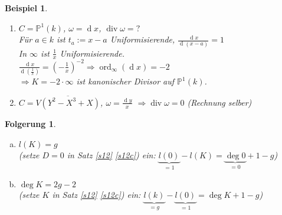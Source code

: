 \documentclass[a4paper,12pt]{report}
\theoremstyle{break}
\newtheorem{Folg}[Def]{Folgerung}
\theoremstyle{nonumberbreak}
\newtheorem{nnBsp}{Beispiel}
\theoremstyle{nonumberplain}
\DeclareMathOperator{\ddiv}{div}
\DeclareMathOperator{\dd}{d} %
\DeclareMathOperator{\ord}{ord}
\newcommand{\IP}{\mathbb{P}}%
\begin{document}
\begin{nnBsp}\begin{enumerate}[1)]
\item
	$C=\IP^1(k)$, $\omega=\dd x$, $\ddiv \omega =?$\\
	F\"ur $a\in k$ ist $t_a:=x-a$ Uniformisierende, $\frac{\dd x}{\dd (x-a)}=1$\\
	In $\infty$ ist $\frac{1}{x}$ Uniformisierende.\\
	$\frac{\dd x}{\dd(\frac{1}{x})} = (-\frac{1}{x})^{-2} \Rightarrow \ord_\infty(\dd x) = -2$\\
	$\Rightarrow K=-2\cdot \infty$ ist kanonischer Divisor auf $\IP^1(k)$.
\item
	$C=\overline{V(Y^2-X^3+X)}$, $\omega = \frac{\dd y}{x}$ $\Rightarrow \ddiv \omega = 0$ (Rechnung selber)
\end{enumerate}\end{nnBsp}

\begin{Folg}\begin{enumerate}[a)]
\item
	$l(K)=g$\\
	(setze $D=0$ in Satz \ref{s12} \ref{s12c}) ein: $\underbrace{l(0)}_{=1} - l(K) = \underbrace{\deg 0}_{=0} + 1 - g$)
	\item
	$\deg K = 2g - 2$\\
	(setze $K$ in Satz \ref{s12} \ref{s12c}) ein: $\underbrace{l(k)}_{=g} - \underbrace{l(0)}_{=1} = \deg K + 1 - g$)
\end{enumerate}\end{Folg}
\end{document}
